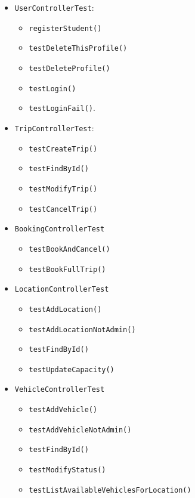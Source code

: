\begin{itemize}
    \item \texttt{UserControllerTest}:
    \begin{itemize}
        \item \texttt{registerStudent()}
        \item \texttt{testDeleteThisProfile()}
        \item \texttt{testDeleteProfile()}
        \item \texttt{testLogin()}
        \item \texttt{testLoginFail()}.
    \end{itemize}
    \item \texttt{TripControllerTest}: 
    \begin{itemize}
        \item \texttt{testCreateTrip()}
        \item \texttt{testFindById()}
        \item \texttt{testModifyTrip()}
        \item \texttt{testCancelTrip()}
    \end{itemize}
    \item \texttt{BookingControllerTest}
    \begin{itemize}
        \item \texttt{testBookAndCancel()}
        \item \texttt{testBookFullTrip()}
    \end{itemize} 
    \item \texttt{LocationControllerTest}
    \begin{itemize}
        \item \texttt{testAddLocation()}
        \item \texttt{testAddLocationNotAdmin()}
        \item \texttt{testFindById()}
        \item \texttt{testUpdateCapacity()}
    \end{itemize}
    \item \texttt{VehicleControllerTest}
    \begin{itemize}
        \item \texttt{testAddVehicle()}
        \item \texttt{testAddVehicleNotAdmin()}
        \item \texttt{testFindById()}
        \item \texttt{testModifyStatus()}
        \item \texttt{testListAvailableVehiclesForLocation()}
    \end{itemize}
\end{itemize}
